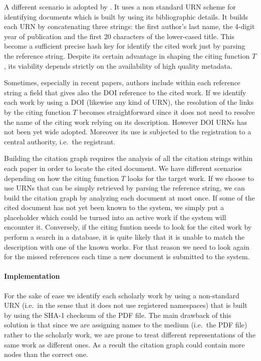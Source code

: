 A different scenario is adopted by \cite{bergmark2000aer}. It uses a non standard URN scheme for identifying documents which is built by using its bibliographic details. It builds each URN by concatenating three strings: the first author's last name, the 4-digit year of publication and the first 20 characters of the lower-cased title. This become a sufficient precise hash key for identify the cited work just by parsing the reference string. Despite its certain advantage in shaping the citing function $T$, its viability depends strictly on the availability of high quality metadata.

Sometimes, especially in recent papers, authors include within each reference string a field that gives also the DOI reference to the cited work. If we identify each work by using a DOI (likewise any kind of URN), the resolution of the links by the citing function $T$ becomes straightforward since it does not need to resolve the name of the citing work relying on its description. However DOI URNs has not been yet wide adopted. Moreover its use is subjected to the registration to a central authority, i.e.\ the registrant.

Building the citation graph requires the analysis of all the citation strings within each paper in order to locate the cited document. We have different scenarios depending on how the citing function $T$ looks for the target work. If we choose to use URNs that can be simply retrieved by parsing the reference string, we can build the citation graph by analyzing each document at most once. If some of the cited document has not yet been known to the system, we simply put a placeholder which could be turned into an active work if the system will encounter it. Conversely, if the citing funtion needs to look for the cited work by perform a search in a database, it is quite likely that it is unable to match the description with one of the known works. For that reason we need to look again for the missed references each time a new document is submitted to the system.

\paragraph{Implementation} For the sake of ease we identify each scholarly work by using a non-standard URN (i.e.\ in the sense that it does not use registered namespaces) that is built by using the SHA-1 checksum of the PDF file. The main drawback of this solution is that since we are assigning names to the medium (i.e.\ the PDF file) rather to the scholarly work, we are prone to treat different representations of the same work as different ones. As a result the citation graph could contain more nodes than the correct one.

